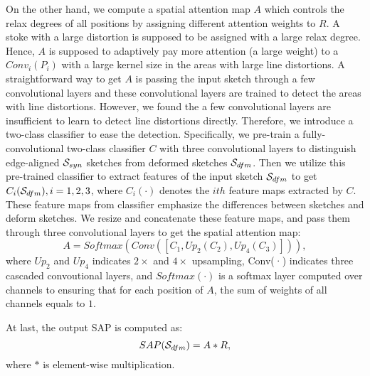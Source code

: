On the other hand, we compute a spatial attention map $A$ which controls the relax degrees of all positions by assigning different attention weights to $R$.
A stoke with a large distortion is supposed to be assigned with a large relax degree. Hence, $A$ is supposed to adaptively pay more attention (a large weight) to a $Conv_i(P_i)$ with a large kernel size in the areas with large line distortions.
%
A straightforward way to get $A$ is passing the input sketch through a few convolutional layers and these convolutional layers are trained to detect the areas with line distortions. However, we found the a few convolutional layers are insufficient to learn to detect line distortions directly. Therefore, we introduce a two-class classifier to ease the detection. Specifically, we pre-train a fully-convolutional two-class classifier $C$ with three convolutional layers to distinguish edge-aligned $\mathcal{S}_{syn}$ sketches from deformed sketches $\mathcal{S}_{dfm}$. Then we utilize this pre-trained classifier to extract features of the input sketch $\mathcal{S}_{dfm}$ to get ${C_i(\mathcal{S}_{dfm}), i=1,2,3}$, where $C_i(·)$ denotes the $ith$ feature maps extracted by $C$. These feature maps from classifier emphasize the differences between sketches and deform sketches. We resize and concatenate these feature maps, and pass them through three convolutional layers to get the spatial attention map:
%	
\begin{equation}
A=Softmax(Conv([C_1, Up_2(C_2), Up_4(C_3)])), 
\end{equation}
%
where $Up_2$ and $Up_4$ indicates $2\times$ and $4\times$ upsampling, Conv(·) indicates three cascaded convoutional layers, and $Softmax(·)$ is a softmax layer computed over channels to ensuring that for each position of $A$, the sum of weights of all channels equals to $1$.

At last, the output SAP is computed as:
%	
\begin{equation}
SAP(\mathcal{S}_{dfm})=A*R,
\end{equation}
%
where $*$ is element-wise multiplication.

%






